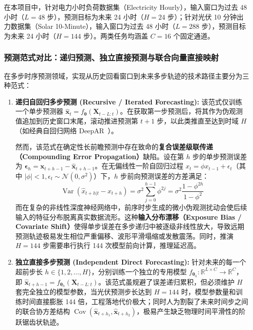 在本项目中，针对电力小时负荷数据集（Electricity Hourly），输入窗口为过去 48 小时（$L=48$ 步），预测目标为未来 24 小时（$H=24$ 步）；针对光伏 10 分钟出力数据集（Solar 10-Minute），输入窗口为过去 48 小时（$L=288$ 步），预测目标为未来 24 小时（$H=144$ 步）。两类任务均涵盖 $C=16$ 个固定通道。

\subsubsection{预测范式对比：递归预测、独立直接预测与联合向量直接映射}
在多步时序预测领域，实现从历史回看窗口到未来多步轨迹的技术路径主要分为三种范式：
\begin{enumerate}
    \item \textbf{递归自回归多步预测 (Recursive / Iterated Forecasting):}
    该范式仅训练一个单步预测器 $\hat{\mathbf{x}}_{t} = f_{\boldsymbol{\theta}}(\mathbf{X}_{t-L:t})$。在获取第一步预测后，将其作为伪观测值追加到历史窗口末尾，滚动推进预测第 $t+1$ 步，以此类推直至达到时域 $H$（如经典自回归网络 DeepAR~\cite{salinas2020deepar}）。
    
    然而，该范式在确定性长前瞻预测中存在致命的\textbf{复合误差级联传递（Compounding Error Propagation）}缺陷。设在第 $h$ 步的单步预测误差为 $\boldsymbol{\epsilon}_h = \mathbf{x}_{t+h-1} - \hat{\mathbf{x}}_{t+h-1}$。在无偏线性一阶自回归过程 $x_t = \phi x_{t-1} + \epsilon_t$（其中 $|\phi| < 1, \epsilon_t \sim \mathcal{N}(0, \sigma^2)$）下，$h$ 步前向预测误差的方差满足：
    \begin{equation}
        \operatorname{Var}(\hat{x}_{t+h|t} - x_{t+h}) = \sigma^2 \sum_{j=0}^{h-1} \phi^{2j} = \sigma^2 \frac{1 - \phi^{2h}}{1 - \phi^2}
    \end{equation}
    而在复杂的非线性深度神经网络中，前序时步生成的微小伪观测扰动会使后续输入的特征分布脱离真实数据流形。这种\textbf{输入分布漂移（Exposure Bias / Covariate Shift）}使得单步误差在多步递归中被逐级非线性放大，导致远期预测轨迹极易发生相位严重偏移、波形平滑塌缩或发散震荡。同时，推演 $H=144$ 步需要串行执行 144 次模型前向计算，推理延迟高。

    \item \textbf{独立直接多步预测 (Independent Direct Forecasting):}
    针对未来的每一个超前步长 $h \in \{1, 2, \dots, H\}$，分别训练一个独立的专用模型 $f_{\boldsymbol{\theta}_h}: \mathbb{R}^{L \times C} \to \mathbb{R}^{C}$，即 $\hat{\mathbf{x}}_{t+h-1} = f_{\boldsymbol{\theta}_h}(\mathbf{X}_{t-L:t})$。该范式虽规避了误差递归累积，但必须维护 $H$ 套完全独立的模型参数，当光伏预测步长达到 $H=144$ 时，模型参数量和训练时间直接膨胀 144 倍，工程落地代价极大；同时人为割裂了未来时间步之间的联合协方差结构 $\operatorname{Cov}(\hat{\mathbf{x}}_{t+h_1}, \hat{\mathbf{x}}_{t+h_2})$，极易产生缺乏物理时间平滑性的阶跃锯齿状轨迹。


\end{enumerate}

